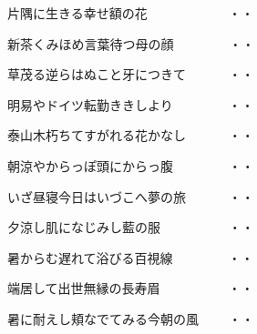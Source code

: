 \vspace{0.4cm}
\begin{shiika}片隅に生きる幸せ額の花　　　　　　
\hfill{・・}\end{shiika}
\vspace{0.4cm}
\begin{shiika}新茶くみほめ言葉待つ母の顔　　　　
\hfill{・・}\end{shiika}
\vspace{0.4cm}
\begin{shiika}草茂る逆らはぬこと牙につきて　　　
\hfill{・・}\end{shiika}
\vspace{0.4cm}
\begin{shiika}明易やドイツ転勤ききしより　　　　
\hfill{・・}\end{shiika}
\vspace{0.4cm}
\begin{shiika}泰山木朽ちてすがれる花かなし　　　
\hfill{・・}\end{shiika}
\vspace{0.4cm}
\begin{shiika}朝涼やからっぽ頭にからっ腹　　　　
\hfill{・・}\end{shiika}
\vspace{0.4cm}
\begin{shiika}いざ昼寝今日はいづこへ夢の旅　　　
\hfill{・・}\end{shiika}
\vspace{0.4cm}
\begin{shiika}夕涼し肌になじみし藍の服　　　　　
\hfill{・・}\end{shiika}
\vspace{0.4cm}
\begin{shiika}暑からむ遅れて浴びる百視線　　　　
\hfill{・・}\end{shiika}
\vspace{0.4cm}
\begin{shiika}端居して出世無縁の長寿眉　　　　　
\hfill{・・}\end{shiika}
\vspace{0.4cm}
\begin{shiika}暑に耐えし頬なでてみる今朝の風　　
\hfill{・・}\end{shiika}
